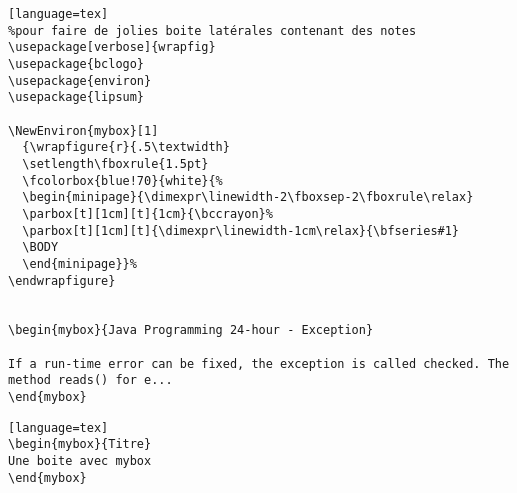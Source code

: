 

\begin{lstlisting}[caption={Commande 3 pour créer des boites}] [language=tex]
%pour faire de jolies boite latérales contenant des notes
\usepackage[verbose]{wrapfig}
\usepackage{bclogo}
\usepackage{environ}
\usepackage{lipsum}

\NewEnviron{mybox}[1]
  {\wrapfigure{r}{.5\textwidth}
  \setlength\fboxrule{1.5pt}
  \fcolorbox{blue!70}{white}{%
  \begin{minipage}{\dimexpr\linewidth-2\fboxsep-2\fboxrule\relax}
  \parbox[t][1cm][t]{1cm}{\bccrayon}%
  \parbox[t][1cm][t]{\dimexpr\linewidth-1cm\relax}{\bfseries#1}
  \BODY
  \end{minipage}}%
\endwrapfigure}


\begin{mybox}{Java Programming 24-hour - Exception}

If a run-time error can be fixed, the exception is called checked. The method reads() for e...
\end{mybox}
\end{lstlisting}


\begin{lstlisting}[caption={Commande 3 pour créer des boites}] [language=tex]
\begin{mybox}{Titre}
Une boite avec mybox
\end{mybox}


\end{lstlisting}

